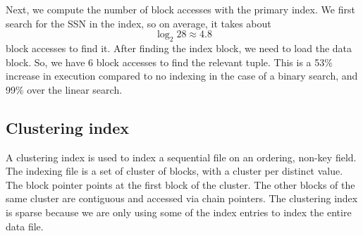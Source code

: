 \documentclass[a4paper, openany]{memoir}
\begin{document}
Next, we compute the number of block accesses with the primary index. We first search for the SSN in the index, so on average, it takes about
\[\log_2 28 \approx 4.8\]
block accesses to find it. After finding the index block, we need to load the data block. So, we have 6 block accesses to find the relevant tuple. This is a 53\% increase in execution compared to no indexing in the case of a binary search, and 99\% over the linear search. 
            
            
            

\subsection{Clustering index}
A clustering index is used to index a sequential file on an ordering, non-key field. The indexing file is a set of cluster of blocks, with a cluster per distinct value. The block pointer points at the first block of the cluster. The other blocks of the same cluster are contiguous and accessed via chain pointers. The clustering index is sparse because we are only using some of the index entries to index the entire data file.
\end{document}
